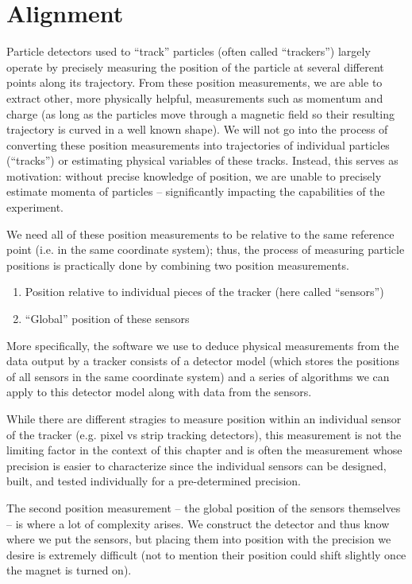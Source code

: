 \chapter{Alignment}
\label{chapter:hps:alignment}

Particle detectors used to ``track'' particles (often called ``trackers'')
largely operate by precisely measuring the position of the particle at several
different points along its trajectory.
From these position measurements, we are able to extract other,
more physically helpful, measurements such as momentum and charge
(as long as the particles move through a magnetic field so their resulting
trajectory is curved in a well known shape).
We will not go into the process of converting these position measurements
into trajectories of individual particles (``tracks'')
or estimating physical variables of these tracks.
Instead, this serves as motivation:
without precise knowledge of position, we are unable to precisely estimate
momenta of particles -- significantly impacting the capabilities of the
experiment.

We need all of these position measurements to be relative
to the same reference point (i.e. in the same coordinate system);
thus, the process of measuring particle positions is practically
done by combining two position measurements.
\begin{enumerate}
	\item Position relative to individual pieces of the tracker (here called ``sensors'')
	\item ``Global'' position of these sensors
\end{enumerate}
More specifically, the software we use to deduce physical measurements from the data
output by a tracker consists of a detector model (which stores the positions of all
sensors in the same coordinate system) and a series of algorithms we can apply to
this detector model along with data from the sensors.

While there are different stragies to measure position within
an individual sensor of the tracker (e.g. pixel vs strip tracking detectors),
this measurement is not the limiting factor in the context of this chapter
and is often the measurement whose precision is easier to characterize
since the individual sensors can be designed, built, and tested individually
for a pre-determined precision.

The second position measurement -- the global position of the sensors themselves
-- is where a lot of complexity arises.
We construct the detector and thus know where we put the sensors,
but placing them into position with the precision we desire is extremely difficult
(not to mention their position could shift slightly once the magnet is turned on).

